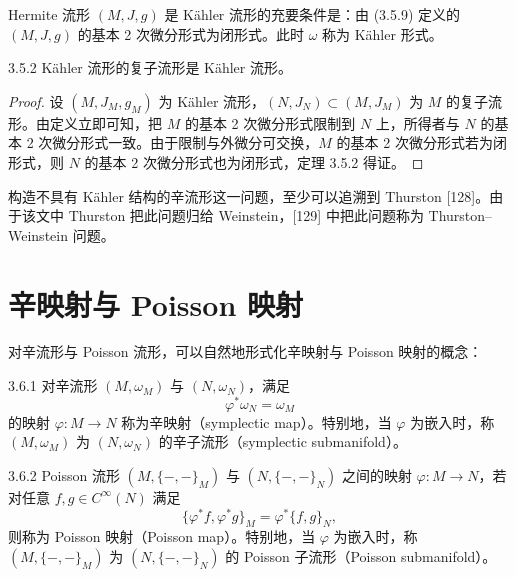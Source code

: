 Hermite 流形 $(M,J,g)$ 是 Kähler 流形的充要条件是：由 (3.5.9) 定义的 $(M,J,g)$ 的基本 2 次微分形式为闭形式。此时 $\omega$ 称为 Kähler 形式。

\begin{theorem*}{3.5.2}
  Kähler 流形的复子流形是 Kähler 流形。
\end{theorem*}

\begin{proof}
  设 $(M,J_M,g_M)$ 为 Kähler 流形，$(N,J_N)\subset(M,J_M)$ 为 $M$ 的复子流形。由定义立即可知，把 $M$ 的基本 2 次微分形式限制到 $N$ 上，所得者与 $N$ 的基本 2 次微分形式一致。由于限制与外微分可交换，$M$ 的基本 2 次微分形式若为闭形式，则 $N$ 的基本 2 次微分形式也为闭形式，定理 3.5.2 得证。
\end{proof}

构造不具有 Kähler 结构的辛流形这一问题，至少可以追溯到 Thurston [128]。由于该文中 Thurston 把此问题归给 Weinstein，[129] 中把此问题称为 Thurston--Weinstein 问题。

\section{辛映射与 Poisson 映射}

对辛流形与 Poisson 流形，可以自然地形式化辛映射与 Poisson 映射的概念：

\begin{definition}{3.6.1}
  对辛流形 $(M,\omega_M)$ 与 $(N,\omega_N)$，满足
  \begin{equation}
    \varphi^*\omega_N=\omega_M
    \tag{3.6.1}
  \end{equation}
  的映射 $\varphi\colon M\to N$ 称为辛映射（symplectic map）。特别地，当 $\varphi$ 为嵌入时，称 $(M,\omega_M)$ 为 $(N,\omega_N)$ 的辛子流形（symplectic submanifold）。
\end{definition}

\begin{definition}{3.6.2}
  Poisson 流形 $(M,\{-,-\}_M)$ 与 $(N,\{-,-\}_N)$ 之间的映射 $\varphi\colon M\to N$，若对任意 $f,g\in C^\infty(N)$ 满足
  \begin{equation}
    \{\varphi^*f,\varphi^*g\}_M=\varphi^*\{f,g\}_N,
    \tag{3.6.2}
  \end{equation}
  则称为 Poisson 映射（Poisson map）。特别地，当 $\varphi$ 为嵌入时，称 $(M,\{-,-\}_M)$ 为 $(N,\{-,-\}_N)$ 的 Poisson 子流形（Poisson submanifold）。
\end{definition}

